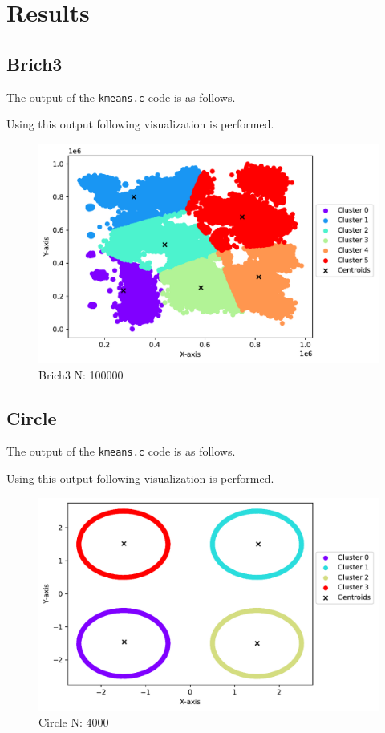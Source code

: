\section{Results}

\subsection{Brich3}
The output of the \texttt{kmeans.c} code is as follows.


Using this output following visualization is performed.
\begin{figure}[H]
    \centering
    \includegraphics[width=.8\textwidth]{figures/brich.pdf}
    \caption{Brich3 N: 100000}
    \label{brich}
\end{figure}

\newpage
\subsection{Circle}
The output of the \texttt{kmeans.c} code is as follows.

Using this output following visualization is performed.

\begin{figure}[H]
    \centering
    \includegraphics[width=.8\textwidth]{figures/circle.pdf}
    \caption{Circle N: 4000}
    \label{circle}
\end{figure}


